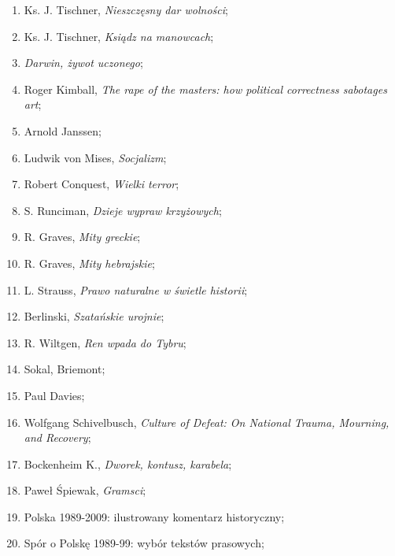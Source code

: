 \documentclass[a4paper,11pt]{article}
\begin{document}
\begin{enumerate}
\item Ks. J. Tischner, \textit{Nieszczęsny dar wolności};

\item Ks. J. Tischner, \textit{Ksiądz na manowcach};

\item \textit{Darwin, żywot uczonego};

\item Roger Kimball, \textit{The rape of the masters: how political
    correctness sabotages art};

\item Arnold Janssen;

\item Ludwik von Mises, \textit{Socjalizm};

\item Robert Conquest, \textit{Wielki terror};

\item S. Runciman, \textit{Dzieje wypraw krzyżowych};

\item R. Graves, \textit{Mity greckie};

\item R. Graves, \textit{Mity hebrajskie};

\item L. Strauss, \textit{Prawo naturalne w świetle historii};

\item Berlinski, \textit{Szatańskie urojnie};

\item R. Wiltgen, \textit{Ren wpada do Tybru};

\item Sokal, Briemont;

\item Paul Davies;

\item Wolfgang Schivelbusch, \textit{Culture of Defeat: On National
    Trauma, Mourning, and Recovery};

\item Bockenheim K., \textit{Dworek, kontusz, karabela};

\item Paweł Śpiewak, \textit{Gramsci};

\item Polska 1989-2009: ilustrowany komentarz historyczny;

\item Spór o Polskę 1989-99: wybór tekstów prasowych;


\end{enumerate}
\end{document}
